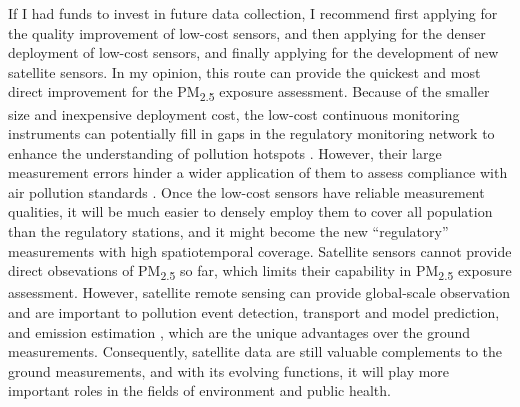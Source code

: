 \documentclass[11pt]{article}
\newcommand{\tsub}{\textsubscript}
\begin{document}
\begin{enumerate*}[{[a)]}]
    \item If I had funds to invest in future data collection, I recommend first applying for the quality improvement of low-cost sensors, and then applying for the denser deployment of low-cost sensors, and finally applying for the development of new satellite sensors. In my opinion, this route can provide the quickest and most direct improvement for the PM\tsub{2.5} exposure assessment. Because of the smaller size and inexpensive deployment cost, the low-cost continuous monitoring instruments can potentially fill in gaps in the regulatory monitoring network to enhance the understanding of pollution hotspots \citep{gao2015distributed}. However, their large measurement errors hinder a wider application of them to assess compliance with air pollution standards \citep{hall2014integrating}. Once the low-cost sensors have reliable measurement qualities, it will be much easier to densely employ them to cover all population than the regulatory stations, and it might become the new ``regulatory'' measurements with high spatiotemporal coverage. Satellite sensors cannot provide direct obsevations of PM\tsub{2.5} so far, which limits their capability in PM\tsub{2.5} exposure assessment. However, satellite remote sensing can provide global-scale observation and are important to pollution event detection, transport and model prediction, and emission estimation \citep{hoff2009remote}, which are the unique advantages over the ground measurements. Consequently, satellite data are still valuable complements to the ground measurements, and with its evolving functions, it will play more important roles in the fields of environment and public health. 
\end{enumerate*}
\end{document}
